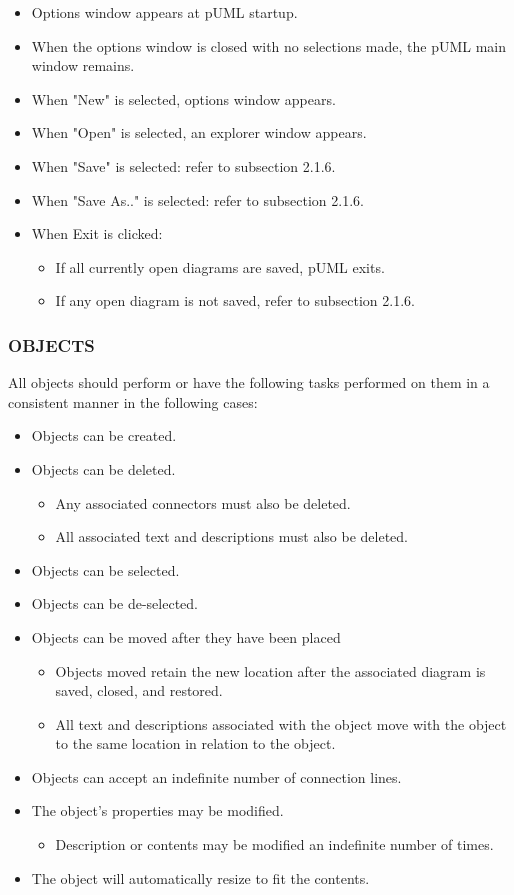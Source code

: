 \documentclass[twoside,letterpaper]{article}
\begin{document}
\begin{itemize}
\item Options window appears at pUML startup.
\item When the options window is closed with no selections made, the pUML main window remains.
\item When "New" is selected, options window appears.
\item When "Open" is selected, an explorer window appears.
\item When "Save" is selected: refer to subsection 2.1.6.
\item When "Save As.." is selected: refer to subsection 2.1.6.
\item When Exit is clicked:
\begin{itemize}
\item If all currently open diagrams are saved, pUML exits.
\item If any open diagram is not saved, refer to subsection 2.1.6.
\end{itemize}

\end{itemize}



\subsubsection[OBJECTS]{\bfseries OBJECTS} 

All objects should perform or have the following tasks performed on them in a consistent manner in the following cases: 
\begin{itemize}
	\item Objects can be created.
	\item Objects can be deleted.
\begin{itemize}
\item Any associated connectors must also be deleted.
\item All associated text and descriptions must also be deleted.
\end{itemize}
	\item Objects can be selected.
	\item Objects can be de-selected.
	\item Objects can be moved after they have been placed
\begin{itemize}
\item Objects moved retain the new location after the associated diagram is saved, closed, and restored.
\item All text and descriptions associated with the object move with the object to the same location in relation to the object.
\end{itemize}
\item Objects can accept an indefinite number of connection lines.
	\item The object's properties may be modified.
\begin{itemize}
\item Description or contents may be modified an indefinite number of times.
\end{itemize}
	\item The object will automatically resize to fit the contents.
\end{itemize}
\end{document}
